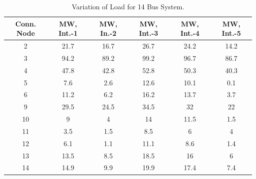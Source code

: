 \documentclass[preprint,12pt,3p]{elsarticle}
\begin{document}
	\begin{table}[ht] 
		
		\caption{Variation of Load for 14 Bus System.} %
		
		\centering %
		
		\begin{tabular}{| c | c | c | c | c | c |} %
			
			\hline\hline %
			
			Conn. Node & MW, Int.-1 & MW, In.-2 & MW, Int.-3  & MW, Int.-4 & MW, Int.-5 \\ [0.5ex] %
			
			
			\hline %
			
			2 &	21.7 &	16.7 &	26.7 &	24.2 &	14.2 \\ %
			\hline
			3 &	94.2 &	89.2 &	99.2 &	96.7 &	86.7 \\ %
			\hline
			4 &	47.8 &	42.8 &	52.8 &	50.3 &	40.3 \\ %
			\hline
			5 &	7.6 &	2.6 &	12.6 &	10.1 &	0.1 \\ %
			\hline
			6 &	11.2 &	6.2 &	16.2 &	13.7 &	3.7 \\ %
			\hline
			9 &	29.5 &	24.5 &	34.5 &	32 &	22 \\ %
			\hline
			10 &	9 &	4 &	14 &	11.5 &	1.5 \\ %
			\hline
			11 &	3.5 &	1.5 &	8.5 &	6 &	4 \\ %
			\hline
			12 &	6.1 &	1.1 &	11.1 &	8.6 &	1.4 \\ %
			\hline
			13 &	13.5 &	8.5 &	18.5 &	16 &	6 \\ %
			\hline
			14 &	14.9 &	9.9 &	19.9 &	17.4 &	7.4 \\ %
			\hline
		\end{tabular} 
		
		\label{table:14LASCOPFLoadModified} %
		
	\end{table}
\end{document}
